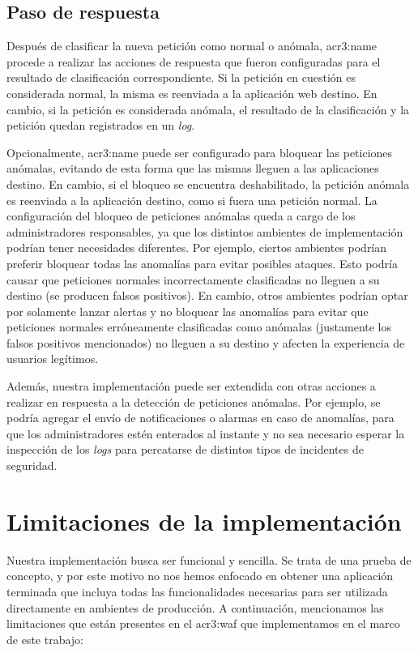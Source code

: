 \subsection{Paso de respuesta}

Después de clasificar la nueva petición como normal o anómala, \gls{acr3:name}
procede a realizar las acciones de respuesta que fueron configuradas para
el resultado de clasificación correspondiente.
Si la petición en cuestión es considerada normal, la misma es reenviada
a la aplicación web destino. En cambio, si la petición es considerada
anómala, el resultado de la clasificación y la petición quedan registrados
en un \textit{log}.

Opcionalmente, \gls{acr3:name} puede ser configurado para bloquear las
peticiones anómalas, evitando de esta forma que las mismas lleguen a las
aplicaciones destino. En cambio, si el bloqueo se encuentra deshabilitado,
la petición anómala es reenviada a la aplicación destino, como si fuera
una petición normal.
La configuración del bloqueo de peticiones anómalas queda a cargo de los
administradores responsables, ya que los distintos ambientes de implementación
podrían tener necesidades diferentes. Por ejemplo, ciertos ambientes podrían
preferir bloquear todas las anomalías para evitar posibles ataques. Esto
podría causar que peticiones normales incorrectamente clasificadas no
lleguen a su destino (se producen falsos positivos).
En cambio, otros ambientes podrían optar por solamente lanzar alertas y
no bloquear las anomalías para evitar que peticiones normales erróneamente
clasificadas como anómalas (justamente los falsos positivos mencionados)
no lleguen a su destino y afecten la experiencia de usuarios legítimos.

Además, nuestra implementación puede ser extendida con otras acciones
a realizar en respuesta a la detección de peticiones anómalas. Por ejemplo,
se podría agregar el envío de notificaciones o alarmas en caso de anomalías,
para que los administradores estén enterados al instante y no sea necesario
esperar la inspección de los \textit{logs} para percatarse de distintos
tipos de incidentes de seguridad.


\section{Limitaciones de la implementación}

Nuestra implementación busca ser funcional y sencilla. Se trata de una
prueba de concepto, y por este motivo no nos hemos enfocado en obtener
una aplicación terminada que incluya todas las funcionalidades necesarias
para ser utilizada directamente en ambientes de producción.
A continuación, mencionamos las limitaciones que están presentes en el
\gls{acr3:waf} que implementamos en el marco de este trabajo:


